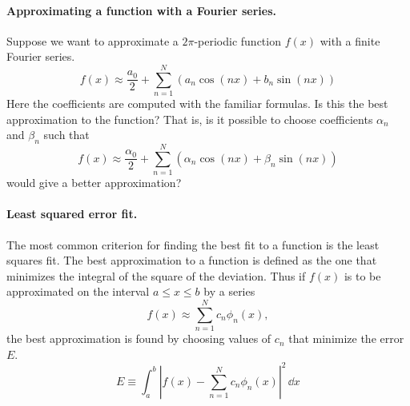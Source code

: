 \paragraph{Approximating a function with a Fourier series.}
Suppose we want to approximate a $2\pi$-periodic function $f(x)$ with
a finite Fourier series.
\[ 
f(x) \approx \frac{a_0}{2} + \sum_{n=1}^{N} (a_n \cos(n x) + b_n \sin(n x))
\]
Here the coefficients are computed with the familiar formulas.
Is this the best approximation to the function?  That is, is it possible
to choose coefficients $\alpha_n$ and $\beta_n$ such that
\[ 
f(x) \approx \frac{\alpha_0}{2} + \sum_{n=1}^N (\alpha_n \cos(n x) + \beta_n \sin(n x)) 
\]
would give a better approximation?



\paragraph{Least squared error fit.}
The most common criterion for finding the best fit to a function is the
least squares fit.  The best approximation to a function is defined
as the one that minimizes the integral of the square of the deviation.
Thus if $f(x)$ is to be approximated on the interval $a \leq x \leq b$
by a series
\begin{equation}
  \label{eqn f = sum cn phin}
  f(x) \approx \sum_{n=1}^{N} c_n \phi_n(x),
\end{equation}
the best approximation is found by choosing values of $c_n$ that
minimize the error $E$.
\[ 
E \equiv \int_a^b \left| f(x) - \sum_{n=1}^{N} c_n \phi_n(x) \right|^2\,\dd x
\]


